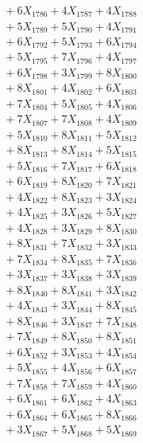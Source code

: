 \documentclass[a4paper,10pt]{article}
\begin{document}
{\begin{align}
&\;  + 6 X_{1786} + 4 X_{1787} + 4 X_{1788} \\[0.3ex]
&\;  + 5 X_{1789} + 5 X_{1790} + 4 X_{1791} \\[0.3ex]
&\;  + 6 X_{1792} + 5 X_{1793} + 6 X_{1794} \\[0.3ex]
&\;  + 5 X_{1795} + 7 X_{1796} + 4 X_{1797} \\[0.3ex]
&\;  + 6 X_{1798} + 3 X_{1799} + 8 X_{1800} \\[0.3ex]
&\;  + 8 X_{1801} + 4 X_{1802} + 6 X_{1803} \\[0.3ex]
&\;  + 7 X_{1804} + 5 X_{1805} + 4 X_{1806} \\[0.3ex]
&\;  + 7 X_{1807} + 7 X_{1808} + 4 X_{1809} \\[0.5ex]\allowbreak
&\;  + 5 X_{1810} + 8 X_{1811} + 5 X_{1812} \\[0.3ex]
&\;  + 8 X_{1813} + 8 X_{1814} + 5 X_{1815} \\[0.3ex]
&\;  + 5 X_{1816} + 7 X_{1817} + 6 X_{1818} \\[0.3ex]
&\;  + 6 X_{1819} + 8 X_{1820} + 7 X_{1821} \\[0.3ex]
&\;  + 4 X_{1822} + 8 X_{1823} + 3 X_{1824} \\[0.3ex]
&\;  + 4 X_{1825} + 3 X_{1826} + 5 X_{1827} \\[0.3ex]
&\;  + 4 X_{1828} + 3 X_{1829} + 8 X_{1830} \\[0.3ex]
&\;  + 8 X_{1831} + 7 X_{1832} + 3 X_{1833} \\[0.3ex]
&\;  + 7 X_{1834} + 8 X_{1835} + 7 X_{1836} \\[0.3ex]
&\;  + 3 X_{1837} + 3 X_{1838} + 3 X_{1839} \\[0.5ex]\allowbreak
&\;  + 8 X_{1840} + 8 X_{1841} + 3 X_{1842} \\[0.3ex]
&\;  + 4 X_{1843} + 3 X_{1844} + 8 X_{1845} \\[0.3ex]
&\;  + 8 X_{1846} + 3 X_{1847} + 7 X_{1848} \\[0.3ex]
&\;  + 7 X_{1849} + 8 X_{1850} + 8 X_{1851} \\[0.3ex]
&\;  + 6 X_{1852} + 3 X_{1853} + 4 X_{1854} \\[0.3ex]
&\;  + 5 X_{1855} + 4 X_{1856} + 6 X_{1857} \\[0.3ex]
&\;  + 7 X_{1858} + 7 X_{1859} + 4 X_{1860} \\[0.3ex]
&\;  + 6 X_{1861} + 6 X_{1862} + 4 X_{1863} \\[0.3ex]
&\;  + 6 X_{1864} + 6 X_{1865} + 8 X_{1866} \\[0.3ex]
&\;  + 3 X_{1867} + 5 X_{1868} + 5 X_{1869} \\[0.5ex]\allowbreak

\end{align}}
\end{document}
